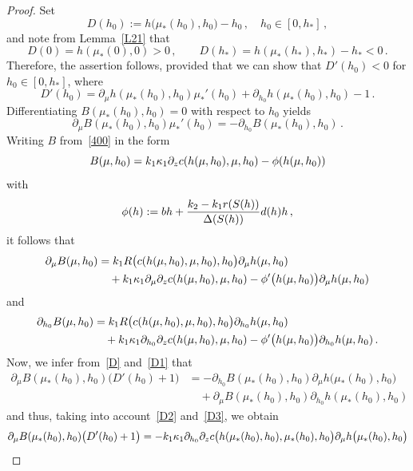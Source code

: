 \documentclass[10pt,a4paper]{amsart}
\begin{document}
\begin{proof}
Set
$$
D(h_0):=h\big(\mu_*(h_0),h_0)-h_0\,,\quad h_0\in [0,h_*]\,,
$$
and note from Lemma~\ref{L21} that
$$
D(0)=h(\mu_*(0),0)>0\,,\qquad  D(h_*)=h(\mu_*(h_*),h_*)-h_*<0\,.
$$
Therefore, the assertion follows, provided that we can show that $D'(h_0)<0$ for $h_0\in[0,h_*]$, where
\begin{equation}\label{D}
D'(h_0)=\partial_\mu h(\mu_*(h_0),h_0)\mu_*'(h_0)+\partial_{h_0}h(\mu_*(h_0),h_0)-1\,.
\end{equation}
Differentiating $B(\mu_*(h_0),h_0)=0$ with respect to $h_0$ yields
\begin{equation}\label{D1}
\partial_\mu B(\mu_*(h_0),h_0)\mu_*'(h_0)=-\partial_{h_0}B(\mu_*(h_0),h_0)\,.
\end{equation}
Writing $B$ from~\eqref{400} in the form 
$$
B(\mu,h_0)=k_1\kappa_1\partial_z{\rm c}(h(\mu,h_0),\mu,h_0)-\phi(h(\mu,h_0)) 
$$
with
$$
\phi(h):=bh+\frac{k_2-k_1{\rm r}(S(h))}{\Delta(S(h))}d(h)h\,,
$$
it follows that
\begin{equation}\label{D2}
\begin{split}
\partial_\mu B(\mu,h_0)&=k_1 R\big({\rm c}(h(\mu,h_0),\mu,h_0),h_0\big) \partial_\mu h(\mu,h_0)\\
&\quad +
k_1\kappa_1 \partial_\mu\partial_z {\rm c}(h(\mu,h_0),\mu,h_0) - \phi'\big(h(\mu,h_0)\big)\partial_\mu h(\mu,h_0)
\end{split}
\end{equation}
and
\begin{equation}\label{D3}
\begin{split}
\partial_{h_0} B(\mu,h_0)&=k_1 R\big({\rm c}(h(\mu,h_0),\mu,h_0),h_0\big) \partial_{h_0} h(\mu,h_0)\\
&\quad +
k_1\kappa_1 \partial_{h_0}\partial_z {\rm c}(h(\mu,h_0),\mu,h_0) - \phi'\big(h(\mu,h_0)\big)\partial_{h_0} h(\mu,h_0)\,.
\end{split}
\end{equation}
Now, we infer from~\eqref{D} and~\eqref{D1} that
\begin{align*}
\partial_{\mu}B(\mu_*(h_0),h_0)\big(D'(h_0)+1\big)&=-\partial_{h_0}B(\mu_*(h_0),h_0) \partial_{\mu}h\big(\mu_*(h_0),h_0)\\
&\quad +\partial_{\mu}B(\mu_*(h_0),h_0) \partial_{h_0} h(\mu_*(h_0),h_0) 
\end{align*}
and thus, taking into account~\eqref{D2} and~\eqref{D3}, we obtain
\begin{align*}
\partial_{\mu}B(\mu_*(h_0),h_0)\big(D'(h_0)+1\big)&=-k_1\kappa_1 \partial_{h_0}\partial_z {\rm c}\big(h(\mu_*(h_0),h_0),\mu_*(h_0),h_0\big) \partial_{\mu} h\big(\mu_*(h_0),h_0\big)\\

\end{align*}
\end{proof}
\end{document}
